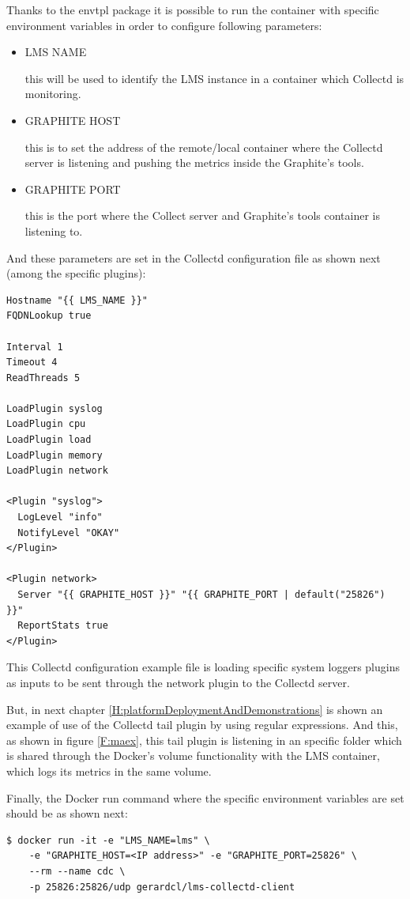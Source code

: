 Thanks to the envtpl package it is possible to run the container with specific environment variables in order to configure following parameters:

\begin{itemize}
\item LMS NAME \hfill

this will be used to identify the LMS instance in a container which Collectd is monitoring.
\item GRAPHITE HOST \hfill

this is to set the address of the remote/local container where the Collectd server is listening and pushing the metrics inside the Graphite's tools.
\item GRAPHITE PORT \hfill

this is the port where the Collect server and Graphite's tools container is listening to.
\end{itemize}

And these parameters are set in the Collectd configuration file as shown next (among the specific plugins):

\begin{verbatim}
Hostname "{{ LMS_NAME }}"
FQDNLookup true

Interval 1
Timeout 4
ReadThreads 5

LoadPlugin syslog
LoadPlugin cpu
LoadPlugin load
LoadPlugin memory
LoadPlugin network

<Plugin "syslog">
  LogLevel "info"
  NotifyLevel "OKAY"
</Plugin>

<Plugin network>
  Server "{{ GRAPHITE_HOST }}" "{{ GRAPHITE_PORT | default("25826") }}"
  ReportStats true
</Plugin>
\end{verbatim}

This Collectd configuration example file is loading specific system loggers plugins as inputs to be sent through the network plugin to the Collectd server.

But, in next chapter \ref{H:platformDeploymentAndDemonstrations} is shown an example of use of the Collectd tail plugin by using regular expressions. And this, as shown in figure \ref{F:maex}, this tail plugin is listening in an specific folder which is shared through the Docker's volume functionality with the LMS container, which logs its metrics in the same volume.

Finally, the Docker run command where the specific environment variables are set should be as shown next:
\begin{verbatim}
$ docker run -it -e "LMS_NAME=lms" \
	-e "GRAPHITE_HOST=<IP address>" -e "GRAPHITE_PORT=25826" \
	--rm --name cdc \
	-p 25826:25826/udp gerardcl/lms-collectd-client
\end{verbatim}

